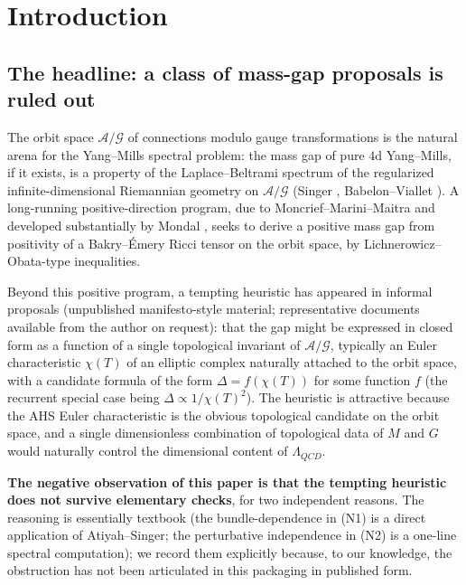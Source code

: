\documentclass[11pt,letterpaper]{article}
\theoremstyle{definition}
\newcommand{\cA}{\mathcal{A}}
\newcommand{\cG}{\mathcal{G}}
\begin{document}
\tableofcontents

\section{Introduction}

\subsection{The headline: a class of mass-gap proposals is ruled out}

The orbit space $\cA/\cG$ of connections modulo gauge transformations is the natural arena for the Yang--Mills spectral problem: the mass gap of pure $4$d Yang--Mills, if it exists, is a property of the Laplace--Beltrami spectrum of the regularized infinite-dimensional Riemannian geometry on $\cA/\cG$ (Singer \cite{Singer1981}, Babelon--Viallet \cite{BabelonViallet1981}). A long-running positive-direction program, due to Moncrief--Marini--Maitra \cite{MMM2019} and developed substantially by Mondal \cite{Mondal2023, Mondal2308}, seeks to derive a positive mass gap from positivity of a Bakry--\'Emery Ricci tensor on the orbit space, by Lichnerowicz--Obata-type inequalities.

Beyond this positive program, a tempting heuristic has appeared in informal proposals (unpublished manifesto-style material; representative documents available from the author on request): that the gap might be expressed in closed form as a function of a single topological invariant of $\cA/\cG$, typically an Euler characteristic $\chi(T)$ of an elliptic complex naturally attached to the orbit space, with a candidate formula of the form $\Delta = f(\chi(T))$ for some function $f$ (the recurrent special case being $\Delta \propto 1/\chi(T)^2$). The heuristic is attractive because the AHS Euler characteristic is the obvious topological candidate on the orbit space, and a single dimensionless combination of topological data of $M$ and $G$ would naturally control the dimensional content of $\Lambda_{QCD}$.

\textbf{The negative observation of this paper is that the tempting heuristic does not survive elementary checks}, for two independent reasons. The reasoning is essentially textbook (the bundle-dependence in (N1) is a direct application of Atiyah--Singer; the perturbative independence in (N2) is a one-line spectral computation); we record them explicitly because, to our knowledge, the obstruction has not been articulated in this packaging in published form.
\end{document}
